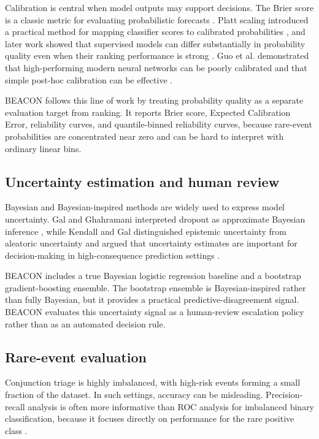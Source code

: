 \documentclass[11pt]{article}
\begin{document}
Calibration is central when model outputs may support decisions. The Brier score is a classic metric for evaluating probabilistic forecasts \citep{brier1950verification}. Platt scaling introduced a practical method for mapping classifier scores to calibrated probabilities \citep{platt1999probabilistic}, and later work showed that supervised models can differ substantially in probability quality even when their ranking performance is strong \citep{niculescu2005predicting}. Guo et al. demonstrated that high-performing modern neural networks can be poorly calibrated and that simple post-hoc calibration can be effective \citep{guo2017calibration}.

BEACON follows this line of work by treating probability quality as a separate evaluation target from ranking. It reports Brier score, Expected Calibration Error, reliability curves, and quantile-binned reliability curves, because rare-event probabilities are concentrated near zero and can be hard to interpret with ordinary linear bins.

\subsection{Uncertainty estimation and human review}

Bayesian and Bayesian-inspired methods are widely used to express model uncertainty. Gal and Ghahramani interpreted dropout as approximate Bayesian inference \citep{gal2016dropout}, while Kendall and Gal distinguished epistemic uncertainty from aleatoric uncertainty and argued that uncertainty estimates are important for decision-making in high-consequence prediction settings \citep{kendall2017uncertainties}.

BEACON includes a true Bayesian logistic regression baseline and a bootstrap gradient-boosting ensemble. The bootstrap ensemble is Bayesian-inspired rather than fully Bayesian, but it provides a practical predictive-disagreement signal. BEACON evaluates this uncertainty signal as a human-review escalation policy rather than as an automated decision rule.

\subsection{Rare-event evaluation}

Conjunction triage is highly imbalanced, with high-risk events forming a small fraction of the dataset. In such settings, accuracy can be misleading. Precision-recall analysis is often more informative than ROC analysis for imbalanced binary classification, because it focuses directly on performance for the rare positive class \citep{saito2015precision}.
\end{document}
